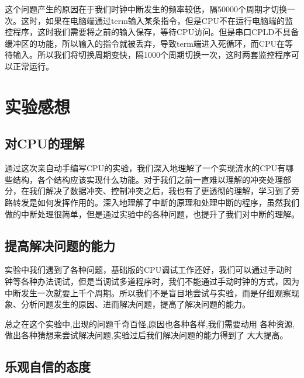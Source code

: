 这个问题产生的原因在于我们时钟中断发生的频率较低，隔50000个周期才切换一次。这时，如果在电脑端通过term输入某条指令，但是CPU不在运行电脑端的监控程序，这时我们需要将之前的输入保存，等待CPU访问。但是串口CPLD不具备缓冲区的功能，所以输入的指令就被丢弃，导致term端进入死循环，而CPU在等待输入。所以我们将切换周期变快，隔1000个周期切换一次，这时两套监控程序可以正常运行。


\section{实验感想}


\subsection{对CPU的理解}

通过这次亲自动手编写CPU的实验，我们深入地理解了一个实现流水的CPU有哪些结构，各个结构应该实现什么功能。对于我们之前一直难以理解的冲突处理部分，在我们解决了数据冲突、控制冲突之后，我也有了更透彻的理解，学习到了旁路转发是如何发挥作用的。深入地理解了中断的原理和处理中断的程序，虽然我们做的中断处理很简单，但是通过实验中的各种问题，也提升了我们对中断的理解。

\subsection{提高解决问题的能力}

实验中我们遇到了各种问题，基础版的CPU调试工作还好，我们可以通过手动时钟等各种办法调试，但是当调试多道程序时，我们不能通过手动时钟的方式，因为中断发生一次就要上千个周期。所以我们不是盲目地尝试与实验，而是仔细观察现象、分析问题发生的原因、进而解决问题，提高了解决问题的能力。

总之在这个实验中,出现的问题千奇百怪,原因也各种各样,我们需要动用 各种资源,做出各种猜想来尝试解决问题,实验过后我们解决问题的能力得到了 大大提高。

\subsection{乐观自信的态度}

